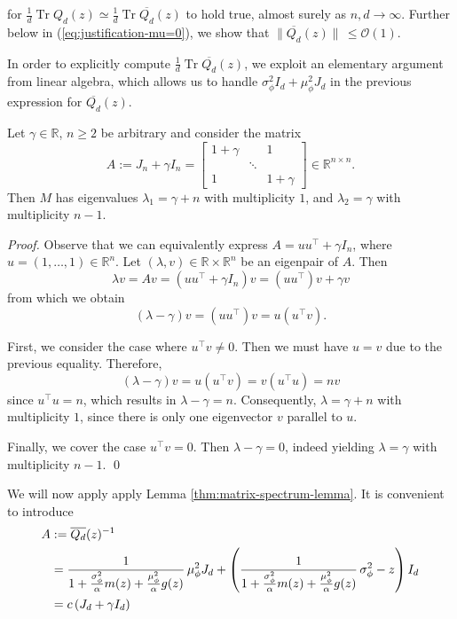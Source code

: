 \documentclass{article}
\begin{document}
for $\frac{1}{d}\operatorname{Tr}Q_d(z)\simeq\frac{1}{d}\operatorname{Tr}\overline{Q_d}(z)$ to hold true, almost surely as $n,d\to\infty$. Further below in (\ref{eq:justification-mu=0}), we show that $\|\overline{Q_d}(z)\|\,\leq\mathcal{O}(1)$.
\bigskip
\par
In order to explicitly compute $\frac{1}{d}\operatorname{Tr}\overline{Q_d}(z)$, we exploit an elementary argument from linear algebra, which allows us to handle $\sigma_\phi^2I_d+\mu_\phi^2J_d$ in the previous expression for $\overline{Q_d}(z)$.
\bigskip
\begin{lemma}\label{thm:matrix-spectrum-lemma}
Let $\gamma\in\mathbb{R}$, $n\geq2$ be arbitrary and consider the matrix
$$A:=J_n+\gamma I_n=\begin{bmatrix} 
1+\gamma & & 1 \\ & \ddots & \\ 1 & & 1+\gamma \end{bmatrix}\in\mathbb{R}^{n\times n}.$$
Then $M$ has eigenvalues $\lambda_1=\gamma+n$ with multiplicity $1$, and $\lambda_2=\gamma$ with multiplicity $n-1$.
\end{lemma}
\bigskip
\noindent
\emph{Proof.} Observe that we can equivalently express $A=uu^\top+\gamma I_n$, where $u=(1,\dots,1)\in\mathbb{R}^n$. Let $(\lambda,v)\in\mathbb{R}\times\mathbb{R}^n$ be an eigenpair of $A$. Then
\begin{equation}
\lambda v=Av=(uu^\top+\gamma I_n)v=(uu^\top) v+\gamma v
\end{equation}
from which we obtain
\begin{equation}
(\lambda-\gamma)v=(uu^\top) v=u(u^\top v).
\end{equation}
\par
First, we consider the case where $u^\top v\neq0$. Then we must have $u=v$ due to the previous equality. Therefore,
\begin{equation}
(\lambda-\gamma)v=u(u^\top v)=v(u^\top u)=nv
\end{equation}
since $u^\top u=n$, which results in $\lambda-\gamma=n$. Consequently, $\lambda=\gamma+n$ with multiplicity $1$, since there is only one eigenvector $v$ parallel to $u$.
\par
Finally, we cover the case $u^\top v=0$. Then $\lambda-\gamma=0$, indeed yielding $\lambda=\gamma$ with multiplicity $n-1$.
\qed
\bigskip
\par
We will now apply apply Lemma \ref{thm:matrix-spectrum-lemma}. It is convenient to introduce
\begin{align}
A&:=\overline{Q_{d}}(z)^{-1} \notag
\\ &=\frac{1}{1+\frac{\sigma_\phi^2}{\alpha}m(z) + \frac{\mu_\phi^2}{\alpha}g(z)}\,\mu_\phi^2J_{d}+\left(\frac{1}{1+\frac{\sigma_\phi^2}{\alpha}m(z) + \frac{\mu_\phi^2}{\alpha}g(z)}\,\sigma_\phi^2-z\right)I_{d} \notag
\\ &= c\,(J_{d}+\gamma I_{d})
\end{align}
\end{document}
